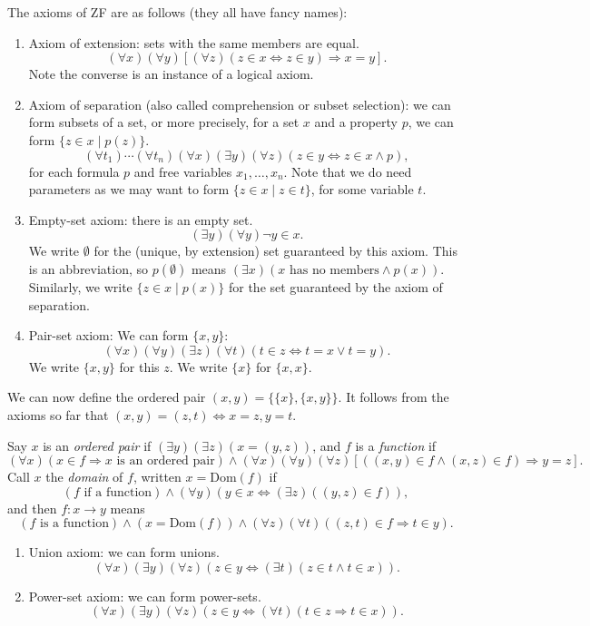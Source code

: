 \documentclass[12pt]{article}
\begin{document}
The axioms of ZF are as follows (they all have fancy names):
\begin{enumerate}
	\item Axiom of extension: sets with the same members are equal.
		\[
			(\forall x)(\forall y)[(\forall z)(z \in x \iff z \in y) \Rightarrow x = y].
		\]
		Note the converse is an instance of a logical axiom.
	\item Axiom of separation (also called comprehension or subset selection): we can form subsets of a set, or more precisely, for a set $x$ and a property $p$, we can form $\{z \in x \mid p(z)\}$.
		\[
			(\forall t_1) \cdots (\forall t_n) (\forall x)(\exists y)(\forall z)(z \in y \iff z \in x \wedge p),
		\]
		for each formula $p$ and free variables $x_1, \ldots, x_n$. Note that we do need parameters as we may want to form $\{z \in x \mid z \in t\}$, for some variable $t$.
	\item Empty-set axiom: there is an empty set.
		\[
			(\exists y)(\forall y)\neg y \in x.
		\]
		We write $\emptyset$ for the (unique, by extension) set guaranteed by this axiom. This is an abbreviation, so $p(\emptyset)$ means $(\exists x)(x \text{ has no members} \wedge p(x))$. Similarly, we write $\{z \in x \mid p(x)\}$ for the set guaranteed by the axiom of separation.
	\item Pair-set axiom: We can form $\{x,y\}$:
		\[
		(\forall x)(\forall y)(\exists z)(\forall t)(t \in z \iff t = x \vee t = y).
		\]
		We write $\{x, y\}$ for this $z$. We write $\{x\}$ for $\{x, x\}$.
\end{enumerate}
We can now define the ordered pair $(x, y) = \{\{x\}, \{x, y\}\}$. It follows from the axioms so far that $(x, y) = (z, t) \iff x = z, y = t$.

Say $x$ is an \emph{ordered pair} if $(\exists y)(\exists z)(x = (y, z))$, and $f$ is a \emph{function} if
\[
	(\forall x)(x \in f \Rightarrow x \text{ is an ordered pair})\wedge (\forall x)(\forall y)(\forall z)[((x, y) \in f \wedge (x, z) \in f) \Rightarrow y = z].
\]
Call $x$ the \emph{domain} of $f$, written $x = \mathrm{Dom}(f)$ if
\[
	(f \text{ if a function}) \wedge (\forall y)(y \in x \iff (\exists z)((y, z) \in f)),
\]
and then $f: x \to y$ means
\[
	(f \text{ is a function}) \wedge (x = \mathrm{Dom}(f)) \wedge (\forall z)(\forall t)((z, t) \in f \Rightarrow t \in y).
\]
\begin{enumerate}[resume]
	\item Union axiom: we can form unions.
		\[
			(\forall x)(\exists y)(\forall z)(z \in y \iff (\exists t)(z \in t \wedge t \in x)).
		\]
	\item Power-set axiom: we can form power-sets.
		\[
			(\forall x)(\exists y)(\forall z)(z \in y \iff (\forall t)(t \in z \Rightarrow t \in x)).
		\]
\end{enumerate}
\end{document}
